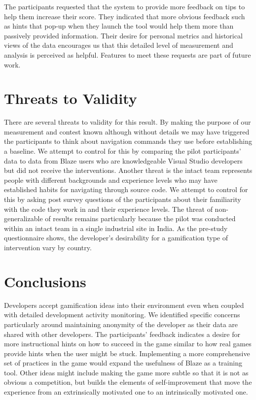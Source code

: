 \documentclass{sig-alternate}
\begin{document}
The participants requested that the system to provide more feedback on tips to help them increase their score. They indicated that more obvious feedback such as hints that pop-up when they launch the tool would help them more than passively provided information.  Their desire for personal metrics and historical views of the data encourages us that this detailed level of measurement and analysis is perceived as helpful.  Features to meet these requests are part of future work.    

\section{Threats to Validity}
There are several threats to validity for this result.  By making the purpose of our measurement and contest known although without details we may have triggered the participants to think about navigation commands they use before establishing a baseline.  We attempt to control for this by comparing the pilot participants' data to data from Blaze users who are knowledgeable Visual Studio developers but did not receive the interventions.  Another threat is the intact team represents people with different backgrounds and experience levels who may have established habits for navigating through source code.  We attempt to control for this by asking post survey questions of the participants about their familiarity with the code they work in and their experience levels.  The threat of non- generalizable of results remains particularly because the pilot was conducted within an intact team in a single industrial site in India. As the pre-study questionnaire shows, the developer's desirability for a gamification type of intervention vary by country.

\section{Conclusions}
Developers accept gamification ideas into their environment even when coupled with detailed development activity monitoring.   We identified specific concerns particularly around maintaining anonymity of the developer as their data are shared with other developers.  The participants' feedback indicates a desire for more instructional hints on how to succeed in the game similar to how real games provide hints when the user might be stuck.  Implementing a more comprehensive set of practices in the game would expand the usefulness of Blaze as a training tool.  Other ideas might include making the game more subtle so that it is not as obvious a competition, but builds the elements of self-improvement that move the experience from an extrinsically motivated one to an intrinsically motivated one.  
\end{document}
